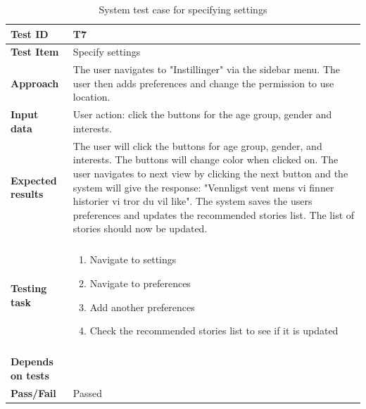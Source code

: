 \begin{appendices}
	\begin{table}[H]
		\small
		\centering
		\caption{System test case for specifying settings}
		\begin{tabular}{ | l | l  |}
			\hline
			\textbf{Test ID} & T7  \\ \hline
			\textbf{Test Item} & Specify settings \\ \hline
			\textbf{Approach} & \begin{minipage}{5in}The user navigates to "Instillinger" via the sidebar menu. The user then adds preferences and change the permission to use location. \end{minipage}\\ \hline		
			\textbf{Input data} &  \begin{minipage}{5in}User action: click the buttons for the age group, gender and interests. \end{minipage}\\ \hline
			\textbf{Expected results} &  \begin{minipage}{5in}The user will click the buttons for age group, gender, and interests. The buttons will change color when clicked on. The user navigates to next view by clicking the next button and the system will give the response: "Vennligst vent mens vi finner historier vi tror du vil like". 
			The system saves the users preferences and updates the recommended stories list. The list of stories should now be updated.  \end{minipage}\\ \hline&\\[-3.8ex]
			\textbf{Testing task} & \begin{minipage}{5in}
			\begin{enumerate}[noitemsep]
				\item Navigate to settings
				\item Navigate to preferences
				\item Add another preferences
				\item Check the recommended stories list to see if it is updated

			\end{enumerate}\end{minipage}
			\\ &\\[-3.8ex]\hline
			\textbf{Depends on tests} & \\ \hline		
			\textbf{Pass/Fail} & Passed \\\hline			
		\end{tabular}
	\label{Tab:systemTesting7}
	\end{table}
	

\end{appendices}
